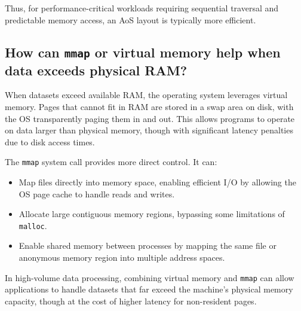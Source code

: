 \documentclass[11pt,letterpaper,oneside]{article}
\begin{document}
Thus, for performance-critical workloads requiring sequential traversal and
predictable memory access, an AoS layout is typically more efficient.

\subsection{How can \texttt{mmap} or virtual memory help when data exceeds
physical RAM?}

When datasets exceed available RAM, the operating system leverages virtual
memory. Pages that cannot fit in RAM are stored in a swap area on disk, with the
OS transparently paging them in and out. This allows programs to operate on data
larger than physical memory, though with significant latency penalties due to
disk access times.

The \texttt{mmap} system call provides more direct control. It can:

\begin{itemize}
    \item Map files directly into memory space, enabling efficient I/O by
    allowing the OS page cache to handle reads and writes.
    \item Allocate large contiguous memory regions, bypassing some limitations
    of \texttt{malloc}.
    \item Enable shared memory between processes by mapping the same file or
    anonymous memory region into multiple address spaces.
\end{itemize}

In high-volume data processing, combining virtual memory and \texttt{mmap} can
allow applications to handle datasets that far exceed the machine’s physical
memory capacity, though at the cost of higher latency for non-resident pages.


\printbibliography
\end{document}
